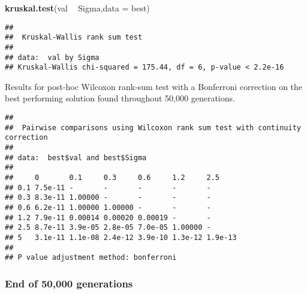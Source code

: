 \documentclass[]{book}
\newenvironment{Shaded}{\begin{snugshade}}{\end{snugshade}}
\newcommand{\DataTypeTok}[1]{\textcolor[rgb]{0.13,0.29,0.53}{#1}}
\newcommand{\KeywordTok}[1]{\textcolor[rgb]{0.13,0.29,0.53}{\textbf{#1}}}
\newcommand{\NormalTok}[1]{#1}
\newcommand{\OperatorTok}[1]{\textcolor[rgb]{0.81,0.36,0.00}{\textbf{#1}}}
\newcommand{\OtherTok}[1]{\textcolor[rgb]{0.56,0.35,0.01}{#1}}
\newcommand{\StringTok}[1]{\textcolor[rgb]{0.31,0.60,0.02}{#1}}
\begin{document}
\begin{Shaded}
\begin{Highlighting}[]
\KeywordTok{kruskal.test}\NormalTok{(val }\OperatorTok{~}\StringTok{ }\NormalTok{Sigma,}\DataTypeTok{data =}\NormalTok{ best)}
\end{Highlighting}
\end{Shaded}

\begin{verbatim}
## 
##  Kruskal-Wallis rank sum test
## 
## data:  val by Sigma
## Kruskal-Wallis chi-squared = 175.44, df = 6, p-value < 2.2e-16
\end{verbatim}

Results for post-hoc Wilcoxon rank-sum test with a Bonferroni correction on the best performing solution found throughout 50,000 generations.

\begin{Shaded}
\end{Shaded}

\begin{verbatim}
## 
##  Pairwise comparisons using Wilcoxon rank sum test with continuity correction 
## 
## data:  best$val and best$Sigma 
## 
##     0       0.1     0.3     0.6     1.2     2.5    
## 0.1 7.5e-11 -       -       -       -       -      
## 0.3 8.3e-11 1.00000 -       -       -       -      
## 0.6 6.2e-11 1.00000 1.00000 -       -       -      
## 1.2 7.9e-11 0.00014 0.00020 0.00019 -       -      
## 2.5 8.7e-11 3.9e-05 2.8e-05 7.0e-05 1.00000 -      
## 5   3.1e-11 1.1e-08 2.4e-12 3.9e-10 1.3e-12 1.9e-13
## 
## P value adjustment method: bonferroni
\end{verbatim}

\hypertarget{end-of-50000-generations-28}{%
\subsubsection{End of 50,000 generations}\label{end-of-50000-generations-28}}
\end{document}
